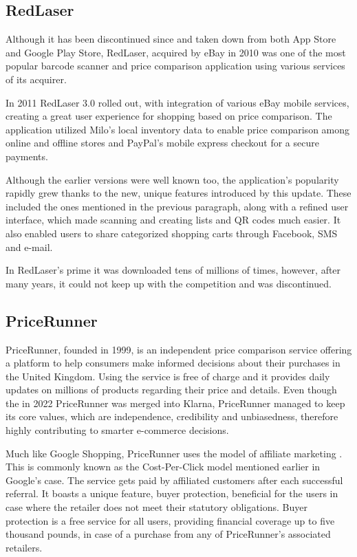 \subsection{RedLaser}
Although it has been discontinued since and taken down from both App Store and Google Play Store, RedLaser, acquired by eBay in 2010 was one of the most popular barcode scanner and price comparison application using various services of its acquirer.

In 2011 RedLaser 3.0 rolled out, with integration of various eBay mobile services, creating a great user experience for shopping based on price comparison. The application utilized Milo's local inventory data to enable price comparison among online and offline stores and PayPal's mobile express checkout for a secure payments.

Although the earlier versions were well known too, the application's popularity rapidly grew thanks to the new, unique features introduced by this update. These included the ones mentioned in the previous paragraph, along with a refined user interface, which made scanning and creating lists and QR codes much easier. It also enabled users to share categorized shopping carts through Facebook, SMS and e-mail.

In RedLaser's prime it was downloaded tens of millions of times, however, after many years, it could not keep up with the competition and was discontinued.

\subsection{PriceRunner}

PriceRunner, founded in 1999, is an independent price comparison service offering a platform to help consumers make informed decisions about their purchases in the United Kingdom. Using the service is free of charge and it provides daily updates on millions of products regarding their price and details. Even though the in 2022 PriceRunner was merged into Klarna, PriceRunner managed to keep its core values, which are independence, credibility and unbiasedness, therefore highly contributing to smarter e-commerce decisions. \cite{PriceRunner2023}

Much like Google Shopping, PriceRunner uses the model of affiliate marketing \cite{PriceRunnerTerms2023}. This is commonly known as the Cost-Per-Click model mentioned earlier in Google's case. The service gets paid by affiliated customers after each successful referral. It boasts a unique feature, buyer protection, beneficial for the users in case where the retailer does not meet their statutory obligations. Buyer protection is a free service for all users, providing financial coverage up to five thousand pounds, in case of a purchase from any of PriceRunner's associated retailers. \cite{PriceRunnerFaq2023}


